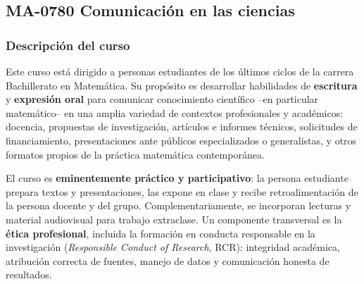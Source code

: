 \newpage
\subsection*{MA-0780 Comunicación en las ciencias}

\hypertarget{MA0780}{}
\begin{refsection}
\begin{table}[H]
\end{table}

\subsubsection*{Descripción del curso}

Este curso está dirigido a personas estudiantes de los últimos ciclos de la carrera Bachillerato en Matemática. Su propósito es desarrollar habilidades de \textbf{escritura} y \textbf{expresión oral} para comunicar conocimiento científico --en particular matemático-- en una amplia variedad de contextos profesionales y académicos: docencia, propuestas de investigación, artículos e informes técnicos, solicitudes de financiamiento, presentaciones ante públicos especializados o generalistas, y otros formatos propios de la práctica matemática contemporánea.

El curso es \textbf{eminentemente práctico y participativo}: la persona estudiante prepara textos y presentaciones, las expone en clase y recibe retroalimentación de la persona docente y del grupo. Complementariamente, se incorporan lecturas y material audiovisual para trabajo extraclase. Un componente transversal es la \textbf{ética profesional}, incluida la formación en conducta responsable en la investigación (\emph{Responsible Conduct of Research}, RCR): integridad académica, atribución correcta de fuentes, manejo de datos y comunicación honesta de resultados.


\end{refsection}
